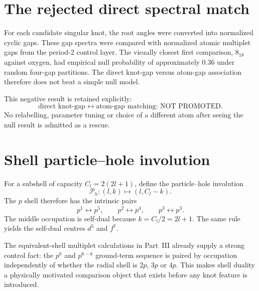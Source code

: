 \section{The rejected direct spectral match}
For each candidate singular knot, the root angles were converted into normalized cyclic gaps.  These gap spectra were compared with normalized atomic multiplet gaps from the period-2 control layer.  The visually closest first comparison, $8_{18}$ against oxygen, had empirical null probability of approximately $0.36$ under random four-gap partitions.  The direct knot-gap versus atom-gap association therefore does not beat a simple null model.

This negative result is retained explicitly:
\begin{equation}
\boxed{\text{direct knot-gap}\leftrightarrow\text{atom-gap matching: NOT PROMOTED}.}
\end{equation}
No relabelling, parameter tuning or choice of a different atom after seeing the null result is admitted as a rescue.

\section{Shell particle--hole involution}
For a subshell of capacity $C_l=2(2l+1)$, define the particle--hole involution
\begin{equation}
\mathcal P_h:(l,k)\mapsto(l,C_l-k).
\end{equation}
The $p$ shell therefore has the intrinsic pairs
\begin{equation}
p^1\leftrightarrow p^5,\qquad p^2\leftrightarrow p^4,\qquad p^3\leftrightarrow p^3.
\end{equation}
The middle occupation is self-dual because $k=C_l/2=2l+1$.  The same rule yields the self-dual centres $d^5$ and $f^7$.

The equivalent-shell multiplet calculations in Part~III already supply a strong control fact: the $p^k$ and $p^{6-k}$ ground-term sequence is paired by occupation independently of whether the radial shell is $2p$, $3p$ or $4p$.  This makes shell duality a physically motivated comparison object that exists before any knot feature is introduced.

